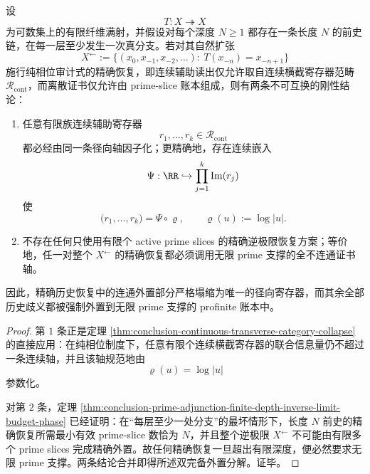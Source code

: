 \begin{theorem}[精确历史恢复的双完备外置]\label{thm:conclusion-history-recovery-radial-profinite-double-completeness}
设
\[
T:X\twoheadrightarrow X
\]
为可数集上的有限纤维满射，并假设对每个深度 \(N\ge 1\) 都存在一条长度 \(N\) 的前史链，在每一层至少发生一次真分支。若对其自然扩张
\[
X^{\leftarrow}
:=
\{(x_0,x_{-1},x_{-2},\dots):\ T(x_{-n})=x_{-n+1}\}
\]
施行纯相位审计式的精确恢复，即连续辅助读出仅允许取自连续横截寄存器范畴 \(\mathcal R_{\mathrm{cont}}\)，而离散证书仅允许由 prime-slice 账本组成，则有两条不可互换的刚性结论：
\begin{enumerate}
\item 任意有限族连续辅助寄存器
\[
r_1,\dots,r_k\in \mathcal R_{\mathrm{cont}}
\]
都必经由同一条径向轴因子化；更精确地，存在连续嵌入
\[
\Psi:\RR\hookrightarrow \prod_{j=1}^k\operatorname{Im}(r_j)
\]
使
\[
\bigl(r_1,\dots,r_k\bigr)=\Psi\circ \varrho,
\qquad
\varrho(u):=\log|u|.
\]
\item 不存在任何只使用有限个 active prime slices 的精确逆极限恢复方案；等价地，任一对整个 \(X^{\leftarrow}\) 的精确恢复都必须调用无限 prime 支撑的全不连通证书轴。
\end{enumerate}
因此，精确历史恢复中的连通外置部分严格塌缩为唯一的径向寄存器，而其余全部历史歧义都被强制外置到无限 prime 支撑的 profinite 账本中。
\end{theorem}
\begin{proof}
第 \(1\) 条正是定理 \ref{thm:conclusion-continuous-transverse-category-collapse} 的直接应用：在纯相位制度下，任意有限个连续横截寄存器的联合信息量仍不超过一条连续轴，并且该轴规范地由
\[
\varrho(u)=\log|u|
\]
参数化。

对第 \(2\) 条，定理 \ref{thm:conclusion-prime-adjunction-finite-depth-inverse-limit-budget-phase} 已经证明：在“每层至少一处分支”的最坏情形下，长度 \(N\) 前史的精确恢复所需最小有效 prime-slice 数恰为 \(N\)，并且整个逆极限 \(X^{\leftarrow}\) 不可能由有限多个 prime slices 完成精确外置。故任何精确恢复一旦超出有限深度，便必然要求无限 prime 支撑。两条结论合并即得所述双完备外置分解。证毕。
\end{proof}

